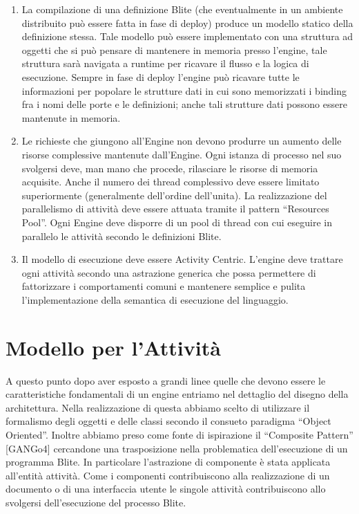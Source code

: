 \begin{enumerate}
  \item La compilazione di una definizione Blite (che eventualmente in un
  ambiente distribuito può essere fatta in fase di deploy) produce un modello
  statico della definizione stessa. Tale modello può essere implementato con una
  struttura ad oggetti che si può pensare di mantenere in memoria presso
  l'engine, tale struttura sarà navigata a runtime per ricavare il
  flusso e la logica di esecuzione. Sempre in fase di deploy l'engine può
  ricavare tutte le informazioni per popolare le strutture dati in cui sono 
  memorizzati i binding fra i nomi delle porte e le definizioni; anche tali
  strutture dati possono essere mantenute in memoria.
  
  \item Le richieste che giungono all'Engine non devono produrre un aumento
  delle risorse complessive mantenute dall'Engine. Ogni istanza di processo nel
  suo svolgersi deve, man mano che procede, rilasciare le risorse di memoria
  acquisite. Anche il numero dei thread complessivo deve essere limitato
  superiormente (generalmente dell'ordine dell'unita). La realizzazione del
  parallelismo di attività deve essere attuata tramite il pattern ``Resources
  Pool''. Ogni Engine deve disporre di un pool di thread con cui eseguire in
  parallelo le attività secondo le definizioni Blite.
  
  \item Il modello di esecuzione deve essere Activity Centric. L'engine deve
  trattare ogni attività secondo una astrazione generica che possa permettere di
  fattorizzare i comportamenti comuni e mantenere semplice e pulita
  l'implementazione della semantica di esecuzione del linguaggio.
\end{enumerate}

\section{Modello per l'Attività}
A questo punto dopo aver esposto a grandi linee quelle che devono essere le
caratteristiche fondamentali di un engine entriamo nel dettaglio del disegno
della architettura. Nella realizzazione di questa abbiamo scelto di utilizzare
il formalismo degli oggetti e delle classi secondo il consueto paradigma
``Object Oriented''. Inoltre abbiamo preso come fonte di
ispirazione il ``Composite Pattern'' [GANGo4] cercandone una trasposizione nella
problematica dell'esecuzione di un programma Blite. In particolare
l'astrazione di componente \`e stata applicata all'entità attività. Come i
componenti contribuiscono alla realizzazione di un documento o di una
interfaccia utente le singole attività contribuiscono allo svolgersi
dell'esecuzione del processo Blite.
 

